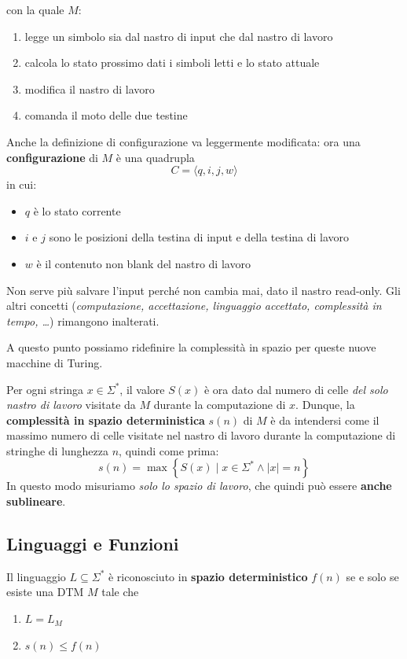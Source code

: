 con la quale $M$:
\begin{enumerate}
	\item legge un simbolo sia dal nastro di input che dal nastro di lavoro
	\item calcola lo stato prossimo dati i simboli letti e lo stato attuale
	\item modifica il nastro di lavoro 
	\item comanda il moto delle due testine
\end{enumerate}

Anche la definizione di configurazione va leggermente modificata: ora una \textbf{configurazione} di $M$ è una quadrupla
$$ C = \langle q, i, j, w \rangle $$
in cui:
\begin{itemize}
	\item $q$ è lo stato corrente
	\item $i$ e $j$ sono le posizioni della testina di input e della testina di lavoro 
	\item $w$ è il contenuto non blank del nastro di lavoro
\end{itemize}

Non serve più salvare l'input perché non cambia mai, dato il nastro read-only. Gli altri concetti (\textit{computazione, accettazione, linguaggio accettato, complessità in tempo, \dots}) rimangono inalterati.

A questo punto possiamo ridefinire la complessità in spazio per queste nuove macchine di Turing.

Per ogni stringa $x \in \Sigma^\ast$, il valore $S(x)$ è ora dato dal numero di celle \textit{del solo nastro di lavoro} visitate da $M$ durante la computazione di $x$. Dunque, la \textbf{complessità in spazio deterministica} $s(n)$ di $M$ è da intendersi come il massimo numero di celle visitate nel nastro di lavoro durante la computazione di stringhe di lunghezza $n$, quindi come prima: 
$$ s(n) = \max \left\{S(x) \mid x \in \Sigma^\ast \wedge |x| = n \right\} $$
In questo modo misuriamo \textit{solo lo spazio di lavoro}, che quindi può essere \textbf{anche sublineare}.

\subsection{Linguaggi e Funzioni}

Il linguaggio $L \subseteq \Sigma^\ast$ è riconosciuto in \textbf{spazio deterministico} $f(n)$ se e solo se esiste una DTM $M$ tale che
\begin{enumerate}
	\item $L = L_M$
	\item $s(n) \leq f(n)$
\end{enumerate}

